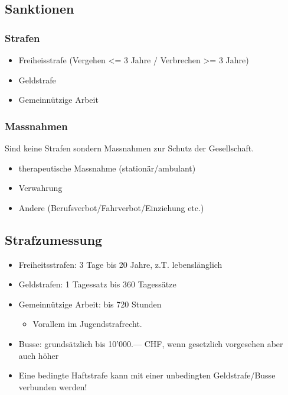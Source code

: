 \subsection{Sanktionen}
\subsubsection{Strafen}

\begin{itemize}
	\tightlist
	\item Freiheisstrafe (Vergehen <= 3 Jahre / Verbrechen >= 3 Jahre)
	\item Geldstrafe
	\item Gemeinnützige Arbeit
\end{itemize}

\subsubsection{Massnahmen}

Sind keine Strafen sondern Massnahmen zur Schutz der Gesellschaft.

\begin{itemize}
	\item therapeutische Massnahme (stationär/ambulant)
	\item Verwahrung
	\item Andere (Berufsverbot/Fahrverbot/Einziehung etc.)
\end{itemize}


\subsection{Strafzumessung}
\begin{itemize}
	\tightlist
	\item Freiheitsstrafen: 3 Tage bis 20 Jahre, z.T. lebenslänglich
	\item Geldstrafen: 1 Tagessatz bis 360 Tagessätze
	\item Gemeinnützige Arbeit: bis 720 Stunden
	\begin{itemize}
		\tightlist
		\item Vorallem im Jugendstrafrecht.
	\end{itemize}
	\item Busse: grundsätzlich bis 10'000.--- CHF, wenn gesetzlich vorgesehen
	aber auch höher
	\item Eine bedingte Haftstrafe kann mit einer unbedingten Geldstrafe/Busse
	verbunden werden!
\end{itemize}

